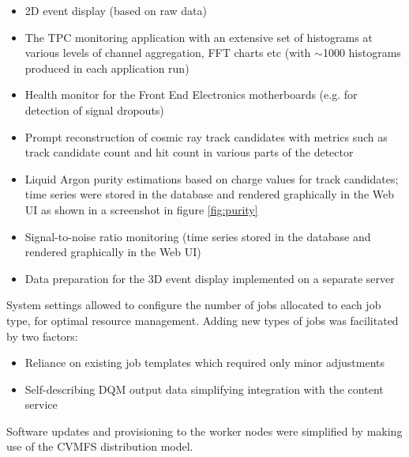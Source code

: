 \documentclass{webofc}
\begin{document}
\begin{itemize}

\item 2D event display (based on raw data)

\item The TPC monitoring application with an extensive set of histograms at various
levels of channel aggregation, FFT charts etc (with $\sim$1000 histograms produced
in each application run)

\item Health monitor for the Front End Electronics motherboards (e.g. for detection of
signal dropouts)

\item Prompt reconstruction of cosmic ray track candidates with metrics such as
track candidate count and hit count in various parts of the detector

\item Liquid Argon purity estimations based on charge values for track candidates;
time series were stored in the database and rendered graphically in the Web UI as shown in
a screenshot in figure \ref{fig:purity}

\item Signal-to-noise ratio monitoring (time series stored in the database and rendered graphically in the Web UI)

\item Data preparation for the 3D event display implemented on a separate server

\end{itemize}

\noindent System settings allowed to configure the number of jobs allocated to each job type,
for optimal resource management. Adding new types of jobs was facilitated by two factors:

\begin{itemize}

\item Reliance on existing job templates which required only minor adjustments

\item Self-describing DQM output data simplifying integration with the content service \cite{chep18}

\end{itemize}

\noindent Software updates and provisioning to the worker nodes were simplified by making use of
the CVMFS distribution model.
\end{document}
